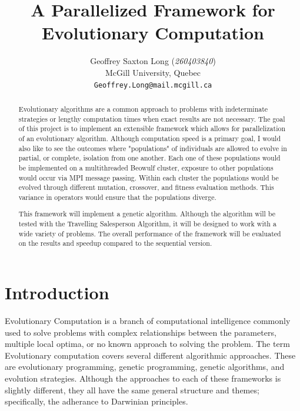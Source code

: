 \documentclass[10pt,letterpaper]{article}
\begin{document}
\title{A Parallelized Framework for Evolutionary Computation}

\author{
	Geoffrey Saxton Long (\textit{260403840})\\
	McGill University, Quebec \\
	{\tt\small Geoffrey.Long@mail.mcgill.ca}
}

\maketitle

\begin{abstract}
Evolutionary algorithms are a common approach to problems with indeterminate strategies or lengthy computation times when exact results are not necessary. The goal of this project is to implement an extensible framework which allows for parallelization of an evolutionary algorithm. Although computation speed is a primary goal, I would also like to see the outcomes where "populations" of individuals are allowed to evolve in partial, or complete, isolation from one another. Each one of these populations would be implemented on a multithreaded Beowulf cluster, exposure to other populations would occur via MPI message passing. Within each cluster the populations would be evolved through different mutation, crossover, and fitness evaluation methods. This variance in operators would ensure that the populations diverge. 

This framework will implement a genetic algorithm. Although the algorithm will be tested with the Travelling Salesperson Algorithm, it will be designed to work with a wide variety of problems. The overall performance of the framework will be evaluated on the results and speedup compared to the sequential version. 
\end{abstract}



\section{Introduction}
Evolutionary Computation is a branch of computational intelligence commonly used to solve problems with complex relationships between the parameters, multiple local optima, or no known approach to solving the problem. The term Evolutionary computation covers several different algorithmic approaches. These are evolutionary programming, genetic programming, genetic algorithms, and evolution strategies. Although the approaches to each of these frameworks is slightly different, they all have the same general structure and themes; specifically, the adherance to Darwinian principles. 
\end{document}

